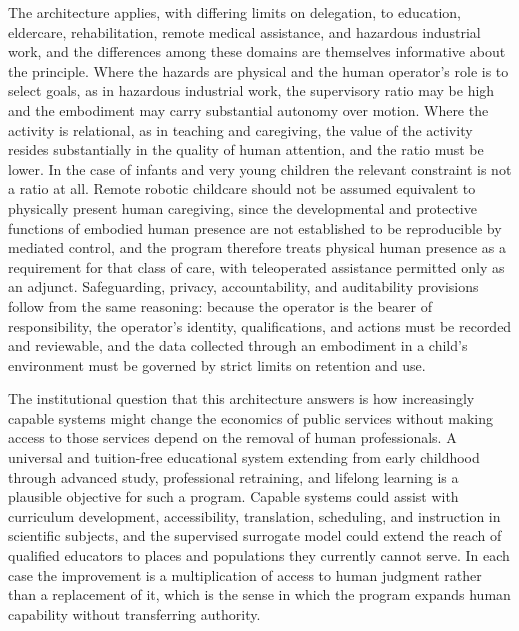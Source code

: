 The architecture applies, with differing limits on delegation, to education, eldercare, rehabilitation, remote medical assistance, and hazardous industrial work, and the differences among these domains are themselves informative about the principle. Where the hazards are physical and the human operator's role is to select goals, as in hazardous industrial work, the supervisory ratio may be high and the embodiment may carry substantial autonomy over motion. Where the activity is relational, as in teaching and caregiving, the value of the activity resides substantially in the quality of human attention, and the ratio must be lower. In the case of infants and very young children the relevant constraint is not a ratio at all. Remote robotic childcare should not be assumed equivalent to physically present human caregiving, since the developmental and protective functions of embodied human presence are not established to be reproducible by mediated control, and the program therefore treats physical human presence as a requirement for that class of care, with teleoperated assistance permitted only as an adjunct. Safeguarding, privacy, accountability, and auditability provisions follow from the same reasoning: because the operator is the bearer of responsibility, the operator's identity, qualifications, and actions must be recorded and reviewable, and the data collected through an embodiment in a child's environment must be governed by strict limits on retention and use.

The institutional question that this architecture answers is how increasingly capable systems might change the economics of public services without making access to those services depend on the removal of human professionals. A universal and tuition-free educational system extending from early childhood through advanced study, professional retraining, and lifelong learning is a plausible objective for such a program. Capable systems could assist with curriculum development, accessibility, translation, scheduling, and instruction in scientific subjects, and the supervised surrogate model could extend the reach of qualified educators to places and populations they currently cannot serve. In each case the improvement is a multiplication of access to human judgment rather than a replacement of it, which is the sense in which the program expands human capability without transferring authority.

